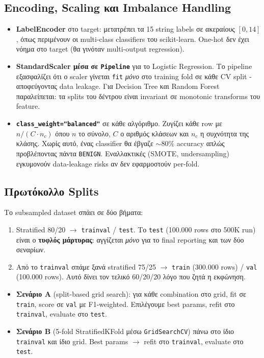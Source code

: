 \documentclass[12pt,a4paper,twoside]{book}
\begin{document}
\subsection{Encoding, Scaling και Imbalance Handling}

\begin{itemize}
    \item \textbf{LabelEncoder} στο target: μετατρέπει τα 15 string
    labels σε ακεραίους \([0, 14]\), όπως περιμένουν οι multi-class
    classifiers του scikit-learn. One-hot δεν έχει νόημα στο target
    (θα γινόταν multi-output regression).
    \item \textbf{StandardScaler μέσα σε \texttt{Pipeline}} για το
    Logistic Regression. Το pipeline εξασφαλίζει ότι ο scaler γίνεται
    \texttt{fit} \emph{μόνο} στο training fold σε κάθε CV split -
    αποφεύγοντας data leakage. Για Decision Tree και Random Forest
    παραλείπεται: τα splits του δέντρου είναι invariant σε monotonic
    transforms του feature.
    \item \textbf{\texttt{class\_weight="balanced"}} σε κάθε αλγόριθμο.
    Ζυγίζει κάθε row με \(n/(C\cdot n_c)\) όπου \(n\) το σύνολο, \(C\)
    ο αριθμός κλάσεων και \(n_c\) η συχνότητα της κλάσης. Χωρίς αυτό,
    ένας classifier θα έβγαζε \(\sim 80\%\) accuracy απλώς
    προβλέποντας πάντα \texttt{BENIGN}. Εναλλακτικές (SMOTE,
    undersampling) εγκυμονούν data-leakage risks αν δεν εφαρμοστούν
    per-fold.
\end{itemize}

\subsection{Πρωτόκολλο Splits}

Το subsampled dataset σπάει σε δύο βήματα:
\begin{enumerate}
    \item Stratified 80/20 \(\to\) \texttt{trainval} / \texttt{test}.
    Το \texttt{test} (100.000 rows στο 500K run) είναι ο \textbf{τυφλός
    μάρτυρας}: αγγίζεται \emph{μόνο} για το final reporting και των δύο
    σεναρίων.
    \item Από το \texttt{trainval} σπάμε ξανά stratified 75/25 \(\to\)
    \texttt{train} (300.000 rows) / \texttt{val} (100.000 rows). Αυτό
    δίνει τον τελικό 60/20/20 λόγο που ζητά η εκφώνηση.
\end{enumerate}

\begin{itemize}
    \item \textbf{Σενάριο A} (split-based grid search): για κάθε
    combination στο grid, fit σε \texttt{train}, score σε
    \texttt{val} με F1-weighted. Επιλέγουμε best params, refit στο
    \texttt{trainval}, evaluate στο \texttt{test}.
    \item \textbf{Σενάριο B} (5-fold StratifiedKFold μέσω
    \texttt{GridSearchCV}) πάνω στο ίδιο \texttt{trainval} και ίδιο
    grid. Best params \(\to\) refit στο \texttt{trainval}, evaluate
    στο \texttt{test}.
\end{itemize}
\end{document}
